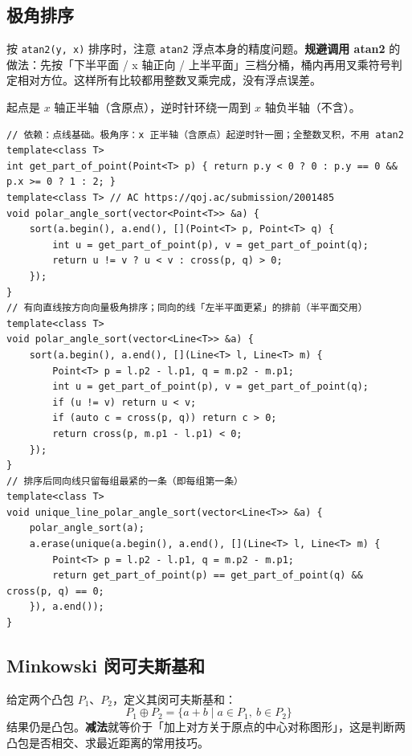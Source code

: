 		\subsection{极角排序}

		按 \texttt{atan2(y, x)} 排序时，注意 \texttt{atan2} 浮点本身的精度问题。\textbf{规避调用 atan2} 的做法：先按「下半平面 / x 轴正向 / 上半平面」三档分桶，桶内再用叉乘符号判定相对方位。这样所有比较都用整数叉乘完成，没有浮点误差。

		起点是 $x$ 轴正半轴（含原点），逆时针环绕一周到 $x$ 轴负半轴（不含）。

\begin{verbatim}
// 依赖：点线基础。极角序：x 正半轴（含原点）起逆时针一圈；全整数叉积，不用 atan2
template<class T>
int get_part_of_point(Point<T> p) { return p.y < 0 ? 0 : p.y == 0 && p.x >= 0 ? 1 : 2; }
template<class T> // AC https://qoj.ac/submission/2001485
void polar_angle_sort(vector<Point<T>> &a) {
	sort(a.begin(), a.end(), [](Point<T> p, Point<T> q) {
		int u = get_part_of_point(p), v = get_part_of_point(q);
		return u != v ? u < v : cross(p, q) > 0;
	});
}
// 有向直线按方向向量极角排序；同向的线「左半平面更紧」的排前（半平面交用）
template<class T>
void polar_angle_sort(vector<Line<T>> &a) {
	sort(a.begin(), a.end(), [](Line<T> l, Line<T> m) {
		Point<T> p = l.p2 - l.p1, q = m.p2 - m.p1;
		int u = get_part_of_point(p), v = get_part_of_point(q);
		if (u != v) return u < v;
		if (auto c = cross(p, q)) return c > 0;
		return cross(p, m.p1 - l.p1) < 0;
	});
}
// 排序后同向线只留每组最紧的一条（即每组第一条）
template<class T>
void unique_line_polar_angle_sort(vector<Line<T>> &a) {
	polar_angle_sort(a);
	a.erase(unique(a.begin(), a.end(), [](Line<T> l, Line<T> m) {
		Point<T> p = l.p2 - l.p1, q = m.p2 - m.p1;
		return get_part_of_point(p) == get_part_of_point(q) && cross(p, q) == 0;
	}), a.end());
}
\end{verbatim}

		\subsection{Minkowski 闵可夫斯基和}

		给定两个凸包 $P_1$、$P_2$，定义其闵可夫斯基和：
		$$
		P_1 \oplus P_2 = \{a + b \mid a \in P_1,\ b \in P_2\}
		$$
		结果仍是凸包。\textbf{减法}就等价于「加上对方关于原点的中心对称图形」，这是判断两凸包是否相交、求最近距离的常用技巧。

